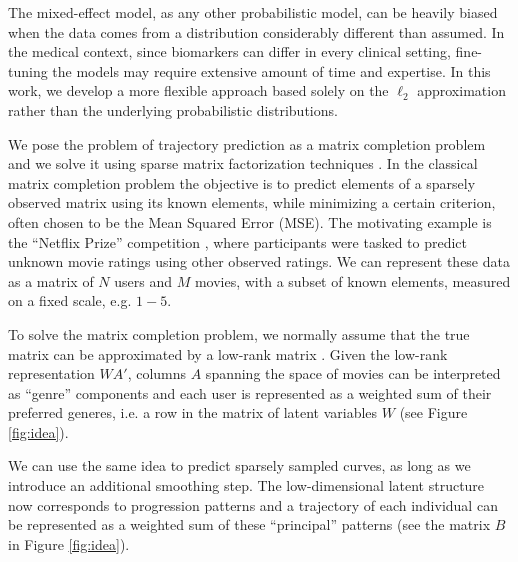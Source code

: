 \documentclass[preprint]{imsart}
\numberwithin{equation}{section}
\theoremstyle{plain}
\begin{document}

The mixed-effect model, as any other probabilistic model, can be heavily biased when the data comes from a distribution considerably different than assumed. In the medical context, since biomarkers can differ in every clinical setting, fine-tuning the models may require extensive amount of time and expertise. In this work, we develop a more flexible approach based solely on the $\ell_2$ approximation rather than the underlying probabilistic distributions.

We pose the problem of trajectory prediction as a matrix completion problem and we solve it using sparse matrix factorization techniques \citep{rennie2005fast, candes2009exact}. In the classical matrix completion problem the objective is to predict elements of a sparsely observed matrix using its known elements, while minimizing a certain criterion, often chosen to be the Mean Squared Error (MSE). The motivating example is the ``Netflix Prize'' competition \citep{bennett2007netflix}, where participants were tasked to predict unknown movie ratings using other observed ratings. We can represent these data as a matrix of $N$ users and $M$ movies, with a subset of known elements, measured on a fixed scale, e.g. $1-5$.

To solve the matrix completion problem, we normally assume that the true matrix can be approximated by a low-rank matrix \citep{srebro2005generalization}. Given the low-rank representation $WA'$, columns $A$ spanning the space of movies can be interpreted as ``genre'' components and each user is represented as a weighted sum of their preferred generes, i.e. a row in the matrix of latent variables $W$ (see Figure \ref{fig:idea}).

We can use the same idea to predict sparsely sampled curves, as long as we introduce an additional smoothing step. The low-dimensional latent structure now corresponds to progression patterns and a trajectory of each individual can be represented as a weighted sum of these ``principal'' patterns (see the matrix $B$ in Figure \ref{fig:idea}). 

\end{document}
